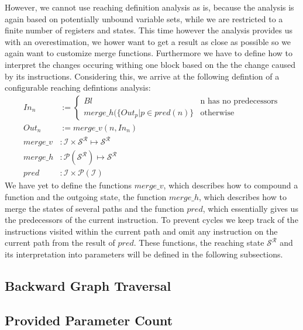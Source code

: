 However, we cannot use reaching definition analysis as is, because the analysis is again based on potentially unbound variable sets, while we are restricted to a finite number of registers and states. This time however the analysis provides us with an overestimation, we hower want to get a result as close as possible so we again want to customize merge functions. Furthermore we have to define how to interpret the changes occuring withing one block based on the the change caused by its instructions. Considering this, we arrive at the following defintion of a configurable reaching defintions analysis:
\begin{subequations}
\label{eq:reachingcustom}
\begin{align}
In_n &:= \left\{
  \begin{array}{lr}
    Bl & \text{n has no predecessors}\\
    merge\_h( \{ Out_p | p \in pred(n) \} & \text{otherwise}
  \end{array}
\right. \label{eq:livenesscustomOut}\\
Out_n &:= merge\_v(n, In_n)\label{eq:livenesscustomIn} \\
merge\_v &: \mathcal{I} \times \mathcal{S}^\mathcal{R} \mapsto \mathcal{S}^\mathcal{R}\\
merge\_h &: \mathcal{P}(\mathcal{S}^\mathcal{R})  \mapsto \mathcal{S}^\mathcal{R}\\
pred &: \mathcal{I} \times \mathcal{P}(\mathcal{I})
\end{align}
\end{subequations}
We have yet to define the functions $merge\_v$, which describes how to compound a function and the outgoing state, the function $merge\_h$, which describes how to merge the states of several paths and the function $pred$, which essentially gives us the predecessors of the current instruction. To prevent cycles we keep track of the instructions visited within the current path and omit any instruction on the current path from the result of $pred$. These functions, the reaching state $\mathcal{S}^\mathcal{R}$  and its interpretation into parameters will be defined in the following subsections.


\subsection{Backward Graph Traversal}
\label{subsection:backwardgraphtraversal}

\subsection{Provided Parameter Count}
\label{subsection:providedparamcount}

